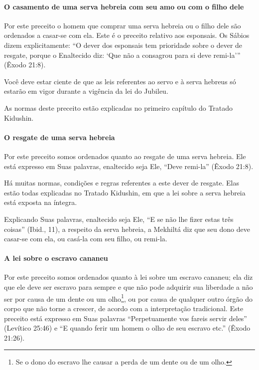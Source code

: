 \paragraph{O casamento de uma serva hebreia com seu amo ou com o filho dele}

Por este preceito o homem que comprar uma serva hebreia ou o filho dele
são ordenados a casar-se com ela. Este é o preceito relativo aos
esponsais. Os Sábios dizem explicitamente: ``O dever dos esponsais tem
prioridade sobre o dever de resgate, porque o Enaltecido diz: `Que não a
consagrou para si deve remi-la''' (Êxodo 21:8).

Você deve estar ciente de que as leis referentes ao servo e à serva
hebreus só estarão em vigor durante a vigência da lei do Jubileu.

As normas deste preceito estão explicadas no primeiro capítulo do
Tratado Kidushin.

\paragraph{O resgate de uma serva hebreia}

Por este preceito somos ordenados quanto ao resgate de uma serva
hebreia. Ele está expresso em Suas palavras, enaltecido seja Ele, ``Deve
remi-la'' (Êxodo 21:8).

Há muitas normas, condições e regras referentes a este dever de
resgate. Elas estão todas explicadas no Tratado Kidushin, em que a lei
sobre a serva hebreia está exposta na íntegra.

Explicando Suas palavras, enaltecido seja Ele, ``E se não lhe fizer
estas três coisas'' (Ibid., 11), a respeito da serva hebreia, a
Mekhiltá diz que seu dono deve casar-se com ela, ou casá-la com seu
filho, ou remi-la.

\paragraph{A lei sobre o escravo cananeu}

Por este preceito somos ordenados quanto à lei sobre um escravo cananeu;
ela diz que ele deve ser escravo para sempre e que não pode adquirir sua
liberdade a não ser por causa de um dente ou um
olho\footnote{Se o dono do escravo lhe causar a perda de um dente ou de um olho.}, ou por causa de qualquer outro órgão do
corpo que não torne a crescer, de acordo com a interpretação
tradicional. Este preceito está expresso em Suas palavras
``Perpetuamente vos fareis servir deles'' (Levítico 25:46) e ``E quando
ferir um homem o olho de seu escravo etc.'' (Êxodo 21:26).


